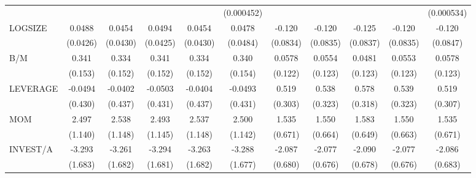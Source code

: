 \begin{table}[htbp]
\begin{tabular}{l*{10}{c}}
                &                  &                  &                  &                  &(0.000452)         &                  &                  &                  &                  &(0.000534)         \\
LOGSIZE         &   0.0488         &   0.0454         &   0.0494         &   0.0454         &   0.0478         &   -0.120         &   -0.120         &   -0.125         &   -0.120         &   -0.120         \\
                & (0.0426)         & (0.0430)         & (0.0425)         & (0.0430)         & (0.0484)         & (0.0834)         & (0.0835)         & (0.0837)         & (0.0835)         & (0.0847)         \\
B/M             &    0.341\sym{**} &    0.334\sym{**} &    0.341\sym{**} &    0.334\sym{**} &    0.340\sym{**} &   0.0578         &   0.0554         &   0.0481         &   0.0553         &   0.0578         \\
                &  (0.153)         &  (0.152)         &  (0.152)         &  (0.152)         &  (0.154)         &  (0.122)         &  (0.123)         &  (0.123)         &  (0.123)         &  (0.123)         \\
LEVERAGE        &  -0.0494         &  -0.0402         &  -0.0503         &  -0.0404         &  -0.0493         &    0.519\sym{*}  &    0.538         &    0.578\sym{*}  &    0.539         &    0.519\sym{*}  \\
                &  (0.430)         &  (0.437)         &  (0.431)         &  (0.437)         &  (0.431)         &  (0.303)         &  (0.323)         &  (0.318)         &  (0.323)         &  (0.307)         \\
MOM             &    2.497\sym{**} &    2.538\sym{**} &    2.493\sym{**} &    2.537\sym{**} &    2.500\sym{**} &    1.535\sym{**} &    1.550\sym{**} &    1.583\sym{**} &    1.550\sym{**} &    1.535\sym{**} \\
                &  (1.140)         &  (1.148)         &  (1.145)         &  (1.148)         &  (1.142)         &  (0.671)         &  (0.664)         &  (0.649)         &  (0.663)         &  (0.671)         \\
INVEST/A        &   -3.293\sym{*}  &   -3.261\sym{*}  &   -3.294\sym{*}  &   -3.263\sym{*}  &   -3.288\sym{*}  &   -2.087\sym{***}&   -2.077\sym{***}&   -2.090\sym{***}&   -2.077\sym{***}&   -2.086\sym{***}\\
                &  (1.683)         &  (1.682)         &  (1.681)         &  (1.682)         &  (1.677)         &  (0.680)         &  (0.676)         &  (0.678)         &  (0.676)         &  (0.683)         \\

\end{tabular}
\end{table}
